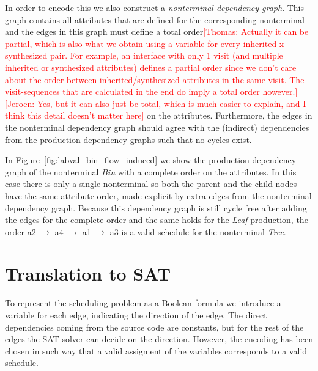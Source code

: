 \documentclass{llncs}
\newif\iffinal\finalfalse
\newcommand{\REM}[3]{\iffinal\else\textcolor{#2}{[#1: #3]}\fi}
\newcommand{\Jeroen}[1]{\REM{Jeroen}{red}{#1}}
\newcommand{\Thomas}[1]{\REM{Thomas}{red}{#1}}
\newcommand{\figref}[1]{Figure~\ref{#1}}
\begin{document}
In order to encode this we also construct a \emph{nonterminal dependency graph}. This graph contains all attributes that are defined for the corresponding nonterminal and the edges in this graph must define a total order\Thomas{Actually it can be partial, which is also what we obtain using a variable for every inherited x synthesized pair. For example, an interface with only 1 visit (and multiple inherited or synthesized attributes) defines a partial order since we don't care about the order between inherited/synthesized attributes in the same visit. The visit-sequences that are calculated in the end do imply a total order however.}\Jeroen{Yes, but it can also just be total, which is much easier to explain, and I think this detail doesn't matter here} on the attributes. Furthermore, the edges in the nonterminal dependency graph should agree with the (indirect) dependencies from the production dependency graphs such that no cycles exist.


In \figref{fig:labval_bin_flow_induced} we show the production dependency graph of the nonterminal \emph{Bin} with a complete order on the attributes. In this case there is only a single nonterminal so both the parent and the child nodes have the same attribute order, made explicit by extra edges from the nonterminal dependency graph. Because this dependency graph is still cycle free after adding the edges for the complete order and the same holds for the \emph{Leaf} production, the order a2 $\rightarrow$ a4 $\rightarrow$ a1 $\rightarrow$ a3 is a valid schedule for the nonterminal \emph{Tree}.


\section{Translation to SAT} \label{sect:translation}
To represent the scheduling problem as a Boolean formula we introduce a variable for each edge, indicating the direction of the edge. The direct dependencies coming from the source code are constants, but for the rest of the edges the SAT solver can decide on the direction. However, the encoding has been chosen in such way that a valid assigment of the variables corresponds to a valid schedule.
\end{document}
